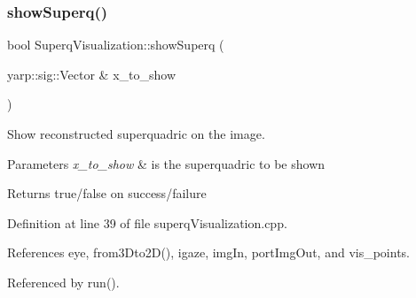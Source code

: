 \subsubsection{\texorpdfstring{show\+Superq()}{showSuperq()}}
{\footnotesize\ttfamily bool Superq\+Visualization\+::show\+Superq (\begin{DoxyParamCaption}\item[{yarp\+::sig\+::\+Vector \&}]{x\+\_\+to\+\_\+show }\end{DoxyParamCaption})}



Show reconstructed superquadric on the image. 


\begin{DoxyParams}{Parameters}
{\em x\+\_\+to\+\_\+show} & is the superquadric to be shown \\
\hline
\end{DoxyParams}
\begin{DoxyReturn}{Returns}
true/false on success/failure 
\end{DoxyReturn}


Definition at line 39 of file superq\+Visualization.\+cpp.



References eye, from3\+Dto2\+D(), igaze, img\+In, port\+Img\+Out, and vis\+\_\+points.



Referenced by run().


